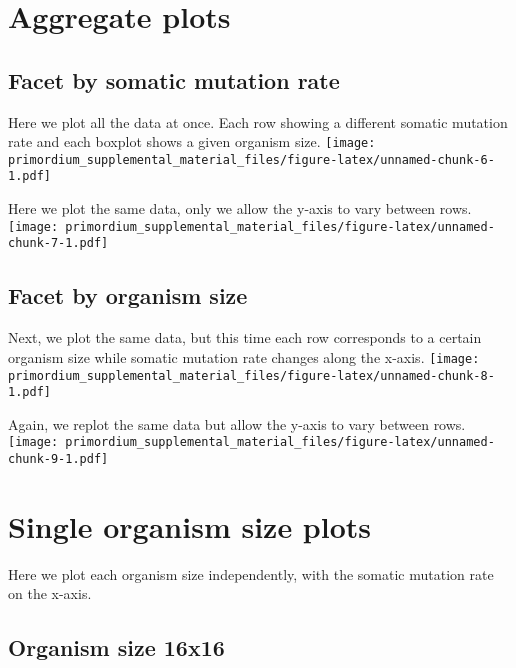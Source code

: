 \documentclass[]{book}
\begin{document}
\hypertarget{aggregate-plots}{%
\section{Aggregate plots}\label{aggregate-plots}}

\hypertarget{facet-by-somatic-mutation-rate}{%
\subsection{Facet by somatic mutation rate}\label{facet-by-somatic-mutation-rate}}

Here we plot all the data at once.
Each row showing a different somatic mutation rate and each boxplot shows a given organism size.
\texttt{[image: primordium\_supplemental\_material\_files/figure-latex/unnamed-chunk-6-1.pdf]}

Here we plot the same data, only we allow the y-axis to vary between rows.
\texttt{[image: primordium\_supplemental\_material\_files/figure-latex/unnamed-chunk-7-1.pdf]}

\hypertarget{facet-by-organism-size}{%
\subsection{Facet by organism size}\label{facet-by-organism-size}}

Next, we plot the same data, but this time each row corresponds to a certain organism size while somatic mutation rate changes along the x-axis.
\texttt{[image: primordium\_supplemental\_material\_files/figure-latex/unnamed-chunk-8-1.pdf]}

Again, we replot the same data but allow the y-axis to vary between rows.
\texttt{[image: primordium\_supplemental\_material\_files/figure-latex/unnamed-chunk-9-1.pdf]}

\hypertarget{single-organism-size-plots}{%
\section{Single organism size plots}\label{single-organism-size-plots}}

Here we plot each organism size independently, with the somatic mutation rate on the x-axis.

\hypertarget{organism-size-16x16}{%
\subsection{Organism size 16x16}\label{organism-size-16x16}}
\end{document}
